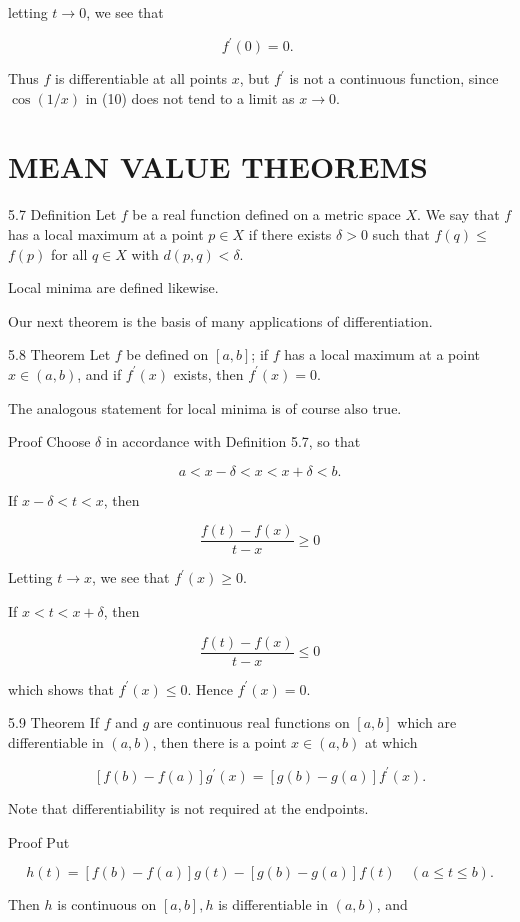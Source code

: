 \documentclass[10pt]{article}
\begin{document}
letting $t \rightarrow 0$, we see that

$$
f^{\prime}(0)=0 \text {. }
$$

Thus $f$ is differentiable at all points $x$, but $f^{\prime}$ is not a continuous function, since $\cos (1 / x)$ in (10) does not tend to a limit as $x \rightarrow 0$.

\section{MEAN VALUE THEOREMS}
5.7 Definition Let $f$ be a real function defined on a metric space $X$. We say that $f$ has a local maximum at a point $p \in X$ if there exists $\delta>0$ such that $f(q) \leq$ $f(p)$ for all $q \in X$ with $d(p, q)<\delta$.

Local minima are defined likewise.

Our next theorem is the basis of many applications of differentiation.

5.8 Theorem Let $f$ be defined on $[a, b]$; if $f$ has a local maximum at a point $x \in(a, b)$, and if $f^{\prime}(x)$ exists, then $f^{\prime}(x)=0$.

The analogous statement for local minima is of course also true.

Proof Choose $\delta$ in accordance with Definition 5.7, so that

$$
a<x-\delta<x<x+\delta<b .
$$

If $x-\delta<t<x$, then

$$
\frac{f(t)-f(x)}{t-x} \geq 0
$$

Letting $t \rightarrow x$, we see that $f^{\prime}(x) \geq 0$.

If $x<t<x+\delta$, then

$$
\frac{f(t)-f(x)}{t-x} \leq 0
$$

which shows that $f^{\prime}(x) \leq 0$. Hence $f^{\prime}(x)=0$.

5.9 Theorem If $f$ and $g$ are continuous real functions on $[a, b]$ which are differentiable in $(a, b)$, then there is a point $x \in(a, b)$ at which

$$
[f(b)-f(a)] g^{\prime}(x)=[g(b)-g(a)] f^{\prime}(x) .
$$

Note that differentiability is not required at the endpoints.

Proof Put

$$
h(t)=[f(b)-f(a)] g(t)-[g(b)-g(a)] f(t) \quad(a \leq t \leq b) .
$$

Then $h$ is continuous on $[a, b], h$ is differentiable in $(a, b)$, and
\end{document}
